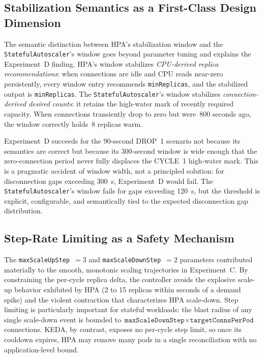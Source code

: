 \documentclass[twocolumn]{svjour3}
\begin{document}
\subsection{Stabilization Semantics as a First-Class Design Dimension}

The semantic distinction between HPA's stabilization window and the \texttt{StatefulAutoscaler}'s
window goes beyond parameter tuning and explains the Experiment~D finding. HPA's window
stabilizes \textit{CPU-derived replica recommendations}: when connections are idle and CPU
reads near-zero persistently, every window entry recommends \texttt{minReplicas}, and the
stabilized output is \texttt{minReplicas}. The \texttt{StatefulAutoscaler}'s window stabilizes
\textit{connection-derived desired counts}: it retains the high-water mark of recently required
capacity. When connections transiently drop to zero but were~800 seconds ago, the window
correctly holds~8 replicas warm.

Experiment~D succeeds for the 90-second DROP~1 scenario not because its semantics are
correct but because its 300-second window is wide enough that the zero-connection period
never fully displaces the CYCLE~1 high-water mark. This is a pragmatic accident of window
width, not a principled solution: for disconnection gaps exceeding 300~s, Experiment~D
would fail. The \texttt{StatefulAutoscaler}'s window fails for gaps exceeding 120~s, but the
threshold is explicit, configurable, and semantically tied to the expected disconnection gap
distribution.

\subsection{Step-Rate Limiting as a Safety Mechanism}

The \texttt{maxScaleUpStep}~$= 3$ and \texttt{maxScaleDownStep}~$= 2$ parameters contributed
materially to the smooth, monotonic scaling trajectories in Experiment~C. By constraining the
per-cycle replica delta, the controller avoids the explosive scale-up behavior exhibited by HPA
(2 to 15 replicas within seconds of a demand spike) and the violent contraction that characterizes
HPA scale-down. Step limiting is particularly important for stateful workloads: the blast radius
of any single scale-down event is bounded to
$\texttt{maxScaleDownStep} \times \texttt{targetConnsPerPod}$ connections. KEDA, by
contrast, exposes no per-cycle step limit, so once its cooldown expires, HPA may remove
many pods in a single reconciliation with no application-level bound.
\end{document}
